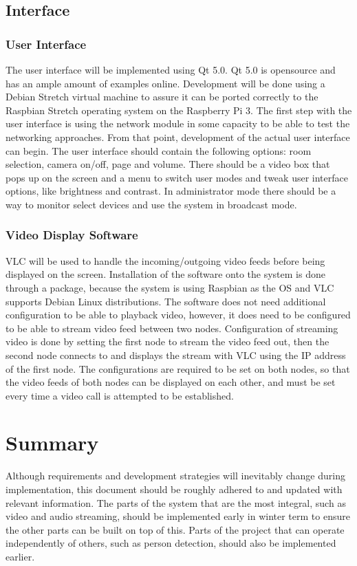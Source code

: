 \documentclass[onecolumn, draftclsnofoot,10pt, compsoc]{IEEEtran}
\begin{document}
\subsection{Interface}
\subsubsection{User Interface}
The user interface will be implemented using Qt 5.0. Qt 5.0 is opensource and has an ample amount of examples online. Development will be done using a Debian Stretch virtual machine to assure it can be ported correctly to the Raspbian Stretch operating system on the Raspberry Pi 3. The first step with the user interface is using the network module in some capacity to be able to test the networking approaches. From that point, development of the actual user interface can begin. The user interface should contain the following options: room selection, camera on/off, page and volume. There should be a video box that pops up on the screen and a menu to switch user modes and tweak user interface options, like brightness and contrast. In administrator mode there should be a way to monitor select devices and use the system in broadcast mode.

\subsubsection{Video Display Software}
VLC will be used to handle the incoming/outgoing video feeds before being displayed on the screen.
Installation of the software onto the system is done through a package, because the system is using Raspbian as the OS and VLC supports Debian Linux distributions.
The software does not need additional configuration to be able to playback video, however, it does need to be configured to be able to stream video feed between two nodes.
Configuration of streaming video is done by setting the first node to stream the video feed out, then the second node connects to and displays the stream with VLC using the IP address of the first node.
The configurations are required to be set on both nodes, so that the video feeds of both nodes can be displayed on each other, and must be set every time a video call is attempted to be established.

\section{Summary}
Although requirements and development strategies will inevitably change during implementation, this document should be roughly adhered to and updated with relevant information. The parts of the system that are the most integral, such as video and audio streaming, should be implemented early in winter term to ensure the other parts can be built on top of this. Parts of the project that can operate independently of others, such as person detection, should also be implemented earlier. 
\end{document}
